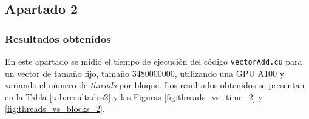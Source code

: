 \documentclass{article}
\begin{document}
	\subsection{Apartado 2}

		\subsubsection{Resultados obtenidos}

			En este apartado se midió el tiempo de ejecución del código \texttt{vectorAdd.cu} para un vector de tamaño fijo, tamaño 3480000000, utilizando una GPU A100 y variando el número de \textit{threads} por bloque. Los resultados obtenidos se presentan en la Tabla \ref{tab:resultados2} y las Figuras \ref{fig:threads_vs_time_2} y \ref{fig:threads_vs_blocks_2}.
\end{document}

